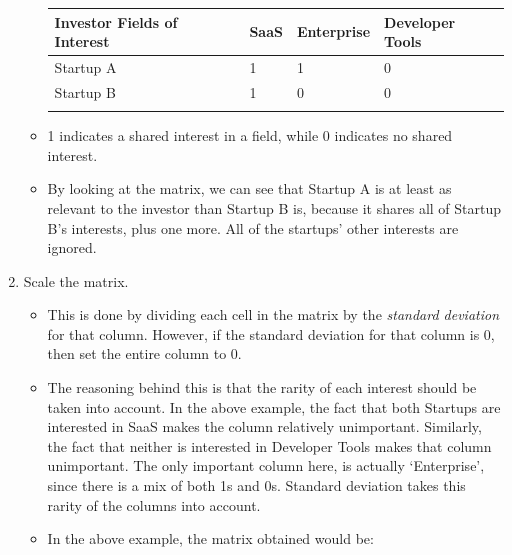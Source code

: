 \documentclass{article}
\begin{document}
\begin{enumerate}
\begin{itemize}
\begin{tabular}{llll}
\hline
\multicolumn{1}{|l|}{Investor Fields of Interest} & \multicolumn{1}{l|}{SaaS} & \multicolumn{1}{l|}{Enterprise} & \multicolumn{1}{l|}{Developer Tools} \\ \hline
\multicolumn{1}{|l|}{Startup A}                   & \multicolumn{1}{l|}{1}    & \multicolumn{1}{l|}{1}          & \multicolumn{1}{l|}{0}               \\ \hline
\multicolumn{1}{|l|}{Startup B}                   & \multicolumn{1}{l|}{1}    & \multicolumn{1}{l|}{0}          & \multicolumn{1}{l|}{0}               \\ \hline
                                                  &                           &                                 &                                     
\end{tabular}
\item 1 indicates a shared interest in a field, while 0 indicates no shared interest.
\item By looking at the matrix, we can see that Startup A is at least as relevant to the investor than Startup B is, because it shares all of Startup B's interests, plus one more. All of the startups' other interests are ignored.
 \end{itemize}
\item Scale the matrix. \begin{itemize} \itemsep-0.3em 
\item This is done by dividing each cell in the matrix by the \textit{standard deviation} for that column. However, if the standard deviation for that column is 0, then set the entire column to 0.
\item The reasoning behind this is that the rarity of each interest should be taken into account. In the above example, the fact that both Startups are interested in SaaS makes the column relatively unimportant. Similarly, the fact that neither is interested in Developer Tools makes that column unimportant. The only important column here, is actually `Enterprise', since there is a mix of both 1s and 0s. Standard deviation takes this rarity of the columns into account.


\item In the above example, the matrix obtained would be: \\ 


\end{itemize}
\end{enumerate}
\end{document}
